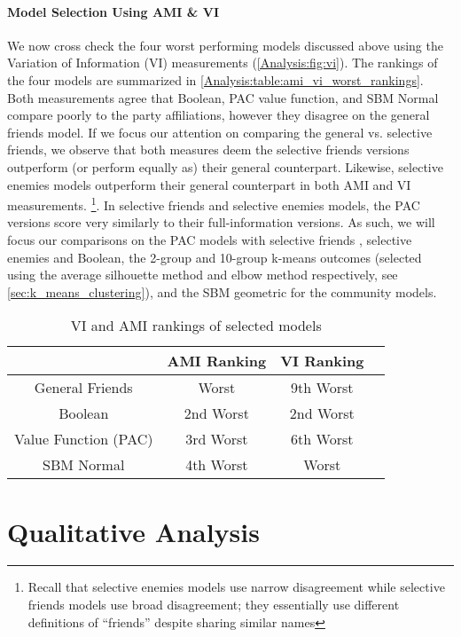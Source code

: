 \paragraph{Model Selection Using AMI \& VI}
We now cross check the four worst performing models discussed above using the
Variation of Information (VI) measurements (\autoref{Analysis:fig:vi}).
The rankings of the four models are summarized in
\autoref{Analysis:table:ami_vi_worst_rankings}.
Both measurements agree that Boolean, PAC value function, and SBM Normal compare poorly
to the party affiliations, however they disagree on the general friends
model.
If we focus our attention on comparing the general vs. selective friends, we
observe that both measures deem the selective friends versions outperform
(or perform equally as) their general counterpart.
Likewise, selective enemies models outperform their general counterpart in
both AMI and VI measurements. \footnote{Recall that selective enemies models
use narrow disagreement while selective friends models use broad disagreement;
they essentially use different definitions of ``friends'' despite sharing
similar names}.
In selective friends and selective enemies models, the PAC versions
score very similarly to their full-information versions.
As such, we will focus our comparisons on the PAC models with selective friends
, selective enemies and Boolean, the 2-group and 10-group k-means outcomes
(selected using the average silhouette method and elbow method respectively,
see \autoref{sec:k_means_clustering}),
and the SBM geometric for the community models.

\begin{table}[ht]
\centering
\begin{tabular}{|c|c|c|c|}
\hline
       & AMI Ranking & VI Ranking \\ \hline
General Friends & Worst & 9th Worst \\
Boolean & 2nd Worst & 2nd Worst \\
Value Function (PAC) & 3rd Worst & 6th Worst \\
SBM Normal & 4th Worst & Worst \\
\hline
\end{tabular}
\caption{VI and AMI rankings of selected models}
\label{Analysis:table:ami_vi_worst_rankings}
\end{table}


\section{Qualitative Analysis}
\label{sec:qualitative_analysis}

